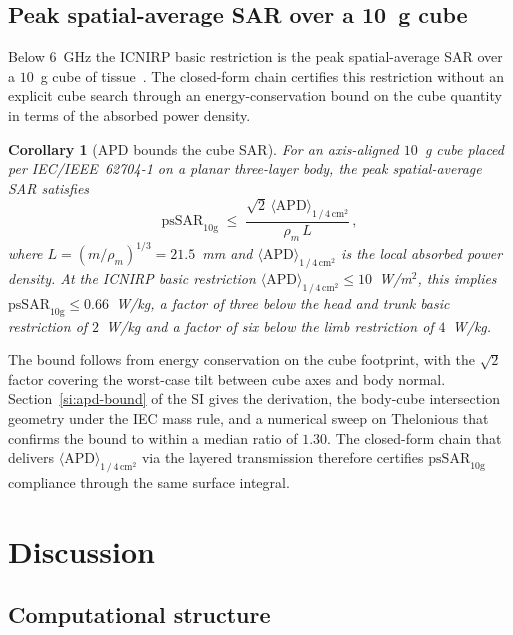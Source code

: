 \documentclass[journal,twocolumn,10pt]{IEEEtran}
\theoremstyle{plain}
\newtheorem{corollary}[theorem]{Corollary}
\theoremstyle{remark}
\newcommand{\APDAvg}{\langle\mathrm{APD}\rangle_{1\,/\,4\,\mathrm{cm}^2}}
\begin{document}
\subsection{Peak spatial-average SAR over a 10~g cube}\label{subsec:compl-cube}

Below $6$~GHz the ICNIRP basic restriction is the peak spatial-average
SAR over a $10$~g cube of tissue~\cite{ICNIRP2020,62704-1}. The
closed-form chain certifies this restriction without an explicit cube
search through an energy-conservation bound on the cube quantity in
terms of the absorbed power density.

\begin{corollary}[APD bounds the cube SAR]\label{cor:apd-bound}
For an axis-aligned $10$~g cube placed per IEC/IEEE~62704-1 on a planar
three-layer body, the peak spatial-average SAR satisfies
\begin{equation}\label{eq:apd-bound}
  \mathrm{psSAR}_{10\mathrm{g}}
  \;\le\; \frac{\sqrt{2}\,\APDAvg}{\rho_m\,L}\, ,
\end{equation}
where $L = (m/\rho_m)^{1/3} = 21.5$~mm and $\APDAvg$ is the local
absorbed power density. At the ICNIRP basic restriction
$\APDAvg \le 10$~W/m$^2$, this implies
$\mathrm{psSAR}_{10\mathrm{g}} \le 0.66$~W/kg, a factor of three below
the head and trunk basic restriction of $2$~W/kg and a factor of six
below the limb restriction of $4$~W/kg.
\end{corollary}

The bound follows from energy conservation on the cube footprint, with
the $\sqrt{2}$ factor covering the worst-case tilt between cube axes
and body normal. Section~\ref{si:apd-bound} of the SI gives the
derivation, the body-cube intersection geometry under the IEC mass
rule, and a numerical sweep on Thelonious that confirms the bound to
within a median ratio of $1.30$. The closed-form chain that delivers
$\APDAvg$ via the layered transmission therefore certifies
$\mathrm{psSAR}_{10\mathrm{g}}$ compliance through the same surface
integral.

\section{Discussion}\label{sec:disc}

\subsection{Computational structure}\label{subsec:disc-primitives}
\end{document}
